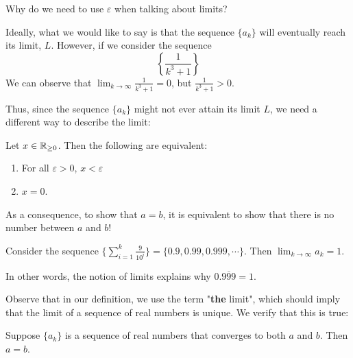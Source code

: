 \begin{motivating}
Why do we need to use $\varepsilon$ when talking about limits?
\end{motivating}

Ideally, what we would like to say is that the sequence $\{a_k\}$ will eventually reach its limit, $L$.  However, if we consider the sequence $$\left\{\frac{1}{k^3 + 1}\right\}$$
We can observe that $\lim_{k\to \infty}\frac{1}{k^3 + 1} = 0$, but $\frac{1}{k^3 + 1} > 0$.

Thus, since the sequence $\{a_k\}$ might not ever attain its limit $L$, we need a different way to describe the limit:

\begin{proposition}\label{epsilonenough}
    Let $x \in \mathbb{R}_{\geq0}$.  Then the following are equivalent:
    
    \begin{enumerate}
        \item For all $\varepsilon >0$,  $x < \varepsilon$
        \item $x = 0$.
    \end{enumerate}
    \end{proposition}

As a consequence, to show that $a = b$, it is equivalent to show that there is no number between $a$ and $b$!


\begin{example}
Consider the sequence $\{\sum_{i=1}^k \frac{9}{10^i}\} = \{0.9, 0.99, 0.999, \cdots \}$.  Then $\lim_{k \to \infty} a_k = 1$.

In other words, the notion of limits explains why $0.\overline{999} = 1$.
\end{example}

Observe that in our definition, we use the term "\textbf{the} limit", which should imply that the limit of a sequence of real numbers is unique.  We verify that this is true:



\begin{proposition}\label{limsequnique1}
    Suppose $\{a_k\}$ is a sequence of real numbers that converges to both $a$ and $b$.  Then $a = b$.
    \end{proposition}

